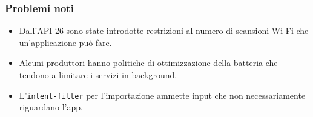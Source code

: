 \documentclass{beamer}
\begin{document}
\begin{frame}
    \frametitle{Problemi noti}

    \begin{itemize}
        \item Dall'API 26 sono state introdotte restrizioni al numero di scansioni Wi-Fi che un'applicazione può fare.
        \item Alcuni produttori hanno politiche di ottimizzazione della batteria che tendono a limitare i servizi in background.
        \item L'\texttt{intent-filter} per l'importazione ammette input che non necessariamente riguardano l'app.
    \end{itemize}
\end{frame}
\end{document}
